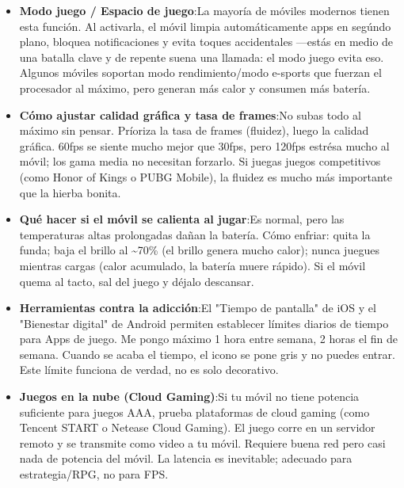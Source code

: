 \begin{itemize}
  \item \textbf{Modo juego / Espacio de juego}:La mayoría de móviles modernos tienen esta función. Al activarla, el móvil limpia automáticamente apps en segúndo plano, bloquea notificaciones y evita toques accidentales —estás en medio de una batalla clave y de repente suena una llamada: el modo juego evita eso. Algunos móviles soportan modo rendimiento/modo e-sports que fuerzan el procesador al máximo, pero generan más calor y consumen más batería.
  \item \textbf{Cómo ajustar calidad gráfica y tasa de frames}:No subas todo al máximo sin pensar. Príoriza la tasa de frames (fluidez), luego la calidad gráfica. 60fps se siente mucho mejor que 30fps, pero 120fps estrésa mucho al móvil; los gama media no necesitan forzarlo. Si juegas juegos competitivos (como Honor of Kings o PUBG Mobile), la fluidez es mucho más importante que la hierba bonita.
  \item \textbf{Qué hacer si el móvil se calienta al jugar}:Es normal, pero las temperaturas altas prolongadas dañan la batería. Cómo enfriar: quita la funda; baja el brillo al \textasciitilde{}70\% (el brillo genera mucho calor); nunca juegues mientras cargas (calor acumulado, la batería muere rápido). Si el móvil quema al tacto, sal del juego y déjalo descansar.
  \item \textbf{Herramientas contra la adicción}:El "Tiempo de pantalla" de iOS y el "Bienestar digital" de Android permiten establecer límites diarios de tiempo para Apps de juego. Me pongo máximo 1 hora entre semana, 2 horas el fin de semana. Cuando se acaba el tiempo, el icono se pone gris y no puedes entrar. Este límite funciona de verdad, no es solo decorativo.
  \item \textbf{Juegos en la nube (Cloud Gaming)}:Si tu móvil no tiene potencia suficiente para juegos AAA, prueba plataformas de cloud gaming (como Tencent START o Netease Cloud Gaming). El juego corre en un servidor remoto y se transmite como video a tu móvil. Requiere buena red pero casi nada de potencia del móvil. La latencia es inevitable; adecuado para estrategia/RPG, no para FPS.
\end{itemize}

